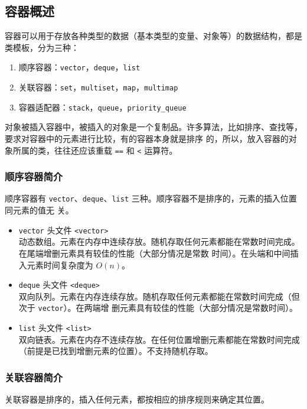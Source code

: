 \documentclass[UTF8]{ctexart}
\begin{document}
\subsection{容器概述}
容器可以用于存放各种类型的数据（基本类型的变量、对象等）的数据结构，都是类模板，分为三种：
\begin{enumerate}
    \item 顺序容器：\texttt{vector}，\texttt{deque}，\texttt{list}
    \item 关联容器：\texttt{set}，\texttt{multiset}，\texttt{map}，\texttt{multimap}
    \item 容器适配器：\texttt{stack}，\texttt{queue}，\texttt{priority\_queue}
\end{enumerate}

对象被插入容器中，被插入的对象是一个复制品。许多算法，比如排序、查找等，要求对容器中的元素进行比较，有的容器本身就是排序
的，所以，放入容器的对象所属的类，往往还应该重载 \texttt{==} 和 \texttt{<} 运算符。

\subsubsection{顺序容器简介}
顺序容器有 \texttt{vector}、\texttt{deque}、\texttt{list} 三种。顺序容器不是排序的，元素的插入位置同元素的值无
关。

\begin{itemize}
    \item \texttt{vector} 头文件 \texttt{<vector>} \\
    动态数组。元素在内存中连续存放。随机存取任何元素都能在常数时间完成。在尾端增删元素具有较佳的性能（大部分情况是常数
    时间）。在头端和中间插入元素时间复杂度为 $O(n)$。
    \item \texttt{deque} 头文件 \texttt{<deque>} \\
    双向队列。元素在内存连续存放。随机存取任何元素都能在常数时间完成（但次于 \texttt{vector}）。在两端增
    删元素具有较佳的性能（大部分情况是常数时间）。
    \item \texttt{list} 头文件 \texttt{<list>} \\
    双向链表。元素在内存不连续存放。在任何位置增删元素都能在常数时间完成（前提是已找到增删元素的位置）。不支持随机存取。
\end{itemize}

\subsubsection{关联容器简介}
关联容器是排序的，插入任何元素，都按相应的排序规则来确定其位置。
\end{document}
